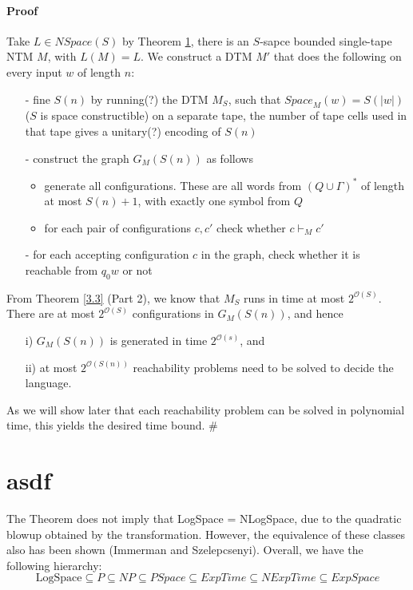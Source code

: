 \documentclass{report}
\newcommand{\NSpace}{\text{$\mathit{NSpace}$}}
\newcommand{\Space}{\text{$\mathit{Space}$}}
\newcommand{\bigO}{\text{$\mathcal{O}$}}
\begin{document}
\paragraph{Proof}Take $L \in \NSpace(S)$ by Theorem \ref{}, there is an $S$-sapce bounded single-tape NTM $M$, with $L(M) = L$. We construct a DTM $M'$ that does the following on every input $w$ of length $n$:
\begin{itemize}
\item[-] fine $S(n)$ by running(?) the DTM $M_S$, such that $\Space_M(w) = S(|w|)$ ($S$ is space constructible) on a separate tape,  the number of tape cells used in that tape gives a unitary(?) encoding of $S(n)$
\item[-] construct the graph $G_M(S(n))$ as follows
\begin{itemize}
\item generate all configurations. These are all words from $(Q \cup \Gamma)^*$ of length at most $S(n)+1$, with exactly one symbol from $Q$
\item for each pair of configurations $c,c'$ check whether $c \vdash_M c'$
\end{itemize}
\item[-] for each accepting configuration $c$ in the graph, check whether it is reachable from $q_0w$ or not
\end{itemize}
From Theorem \ref{3.3} (Part 2), we know that $M_S$ runs in time at most $2^{\bigO(S)}$. There are at most $2^{\bigO(S)}$ configurations in $G_M(S(n))$, and hence
\begin{itemize}
\item[i)]$G_M(S(n))$ is generated in time $2^{\bigO(s)}$, and 
\item[ii)]at most $2^{\bigO(S(n))}$ reachability problems need to be solved to decide the language.
\end{itemize}
As we will show later that each reachability problem can be solved in polynomial time, this yields the desired time bound. $\#$\\


\section{asdf}
The Theorem does not imply that LogSpace = NLogSpace, due to the quadratic blowup obtained by the transformation. However, the equivalence of these classes also has been shown (Immerman and Szelepcsenyi). Overall, we have the following hierarchy:
\[ \text{LogSpace} \subseteq P \subseteq NP \subseteq PSpace \subseteq ExpTime \subseteq NExpTime \subseteq ExpSpace\]
\end{document}

